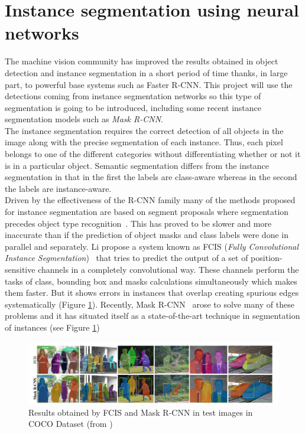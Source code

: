 \section{Instance segmentation using neural networks}
The machine vision community has improved the results obtained in object detection and instance segmentation in a short period of time thanks, in large part, to powerful base systems such as Faster R-CNN. This project will use the detections coming from instance segmentation networks so this type of segmentation is going to be introduced, including some recent instance segmentation models such as \textit{Mask R-CNN}.\\ The instance segmentation requires the correct detection of all objects in the image along with the precise segmentation of each instance. Thus, each pixel belongs to one of the different categories without differentiating whether or not it is in a particular object. Semantic segmentation differs from the instance segmentation in that in the first the labels are class-aware whereas in the second the labels are instance-aware.\\
Driven by the effectiveness of the R-CNN family many of the methods proposed for instance segmentation are based on segment proposals where segmentation precedes object type recognition~\cite{pinheiro2015learning}. This has proved to be slower and more inaccurate than if the prediction of object masks and class labels were done in parallel and separately. Li \etal{}propose a system known as FCIS (\textit{Fully Convolutional Instance Segmentation})~\cite{li2016fully} that tries to predict the output of a set of position-sensitive channels in a completely convolutional way. These channels perform the tasks of class, bounding box and masks calculations simultaneously which makes them faster. But it shows errors in instances that overlap creating spurious edges systematically (Figure \ref{fig:fcis_mask}).
Recently, Mask R-CNN~\cite{he2017mask} arose to solve many of these problems and it has situated itself as a state-of-the-art technique in segmentation of instances (see Figure \ref{fig:fcis_mask})\\
\begin{figure}[H]
\begin{center}
\includegraphics[scale=0.35]{previous_version/fcis_vs_maskrcnn.png}
\caption{Results obtained by FCIS and Mask R-CNN in test images in COCO Dataset (from \cite{he2017mask})}
\label{fig:fcis_mask}
\end{center}
\end{figure}
